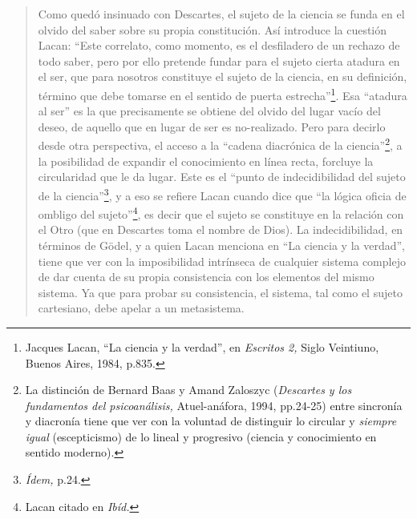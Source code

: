 \begin{quote}
Como quedó insinuado con Descartes, el sujeto de la ciencia se funda en el olvido del saber sobre su propia constitución. Así introduce la cuestión Lacan: \enquote{Este correlato, como momento, es el desfiladero de un rechazo de todo saber, pero por ello pretende fundar para el sujeto cierta atadura en el ser, que para nosotros constituye el sujeto de la ciencia, en su definición, término que debe tomarse en el sentido de puerta estrecha}\footnote{Jacques Lacan, \enquote{La ciencia y la verdad}, en \emph{Escritos 2,} Siglo Veintiuno, Buenos Aires, 1984, p.835.}. Esa \enquote{atadura al ser} es la que precisamente se obtiene del olvido del lugar vacío del deseo, de aquello que en lugar de ser es no-realizado. Pero para decirlo desde otra perspectiva, el acceso a la \enquote{cadena diacrónica de la ciencia}\footnote{La distinción de Bernard Baas y Amand Zaloszyc (\emph{Descartes y los fundamentos del psicoanálisis,} Atuel-anáfora, 1994, pp.24-25) entre sincronía y diacronía tiene que ver con la voluntad de distinguir lo circular y \emph{siempre igual} (escepticismo) de lo lineal y progresivo (ciencia y conocimiento en sentido moderno).}, a la posibilidad de expandir el conocimiento en línea recta, forcluye la circularidad que le da lugar. Este es el \enquote{punto de indecidibilidad del sujeto de la ciencia}\footnote{\emph{Ídem,} p.24.}, y a eso se refiere Lacan cuando dice que \enquote{la lógica oficia de ombligo del sujeto}\footnote{Lacan citado en \emph{Ibíd.}}, es decir que el sujeto se constituye en la relación con el Otro (que en Descartes toma el nombre de Dios). La indecidibilidad, en términos de Gödel, y a quien Lacan menciona en \enquote{La ciencia y la verdad}, tiene que ver con la imposibilidad intrínseca de cualquier sistema complejo de dar cuenta de su propia consistencia con los elementos del mismo sistema. Ya que para probar su consistencia, el sistema, tal como el sujeto cartesiano, debe apelar a un metasistema.


\end{quote}
